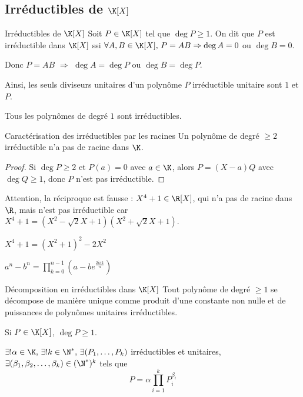 \subsection{Irréductibles de \texorpdfstring{$\K[X]$}{K[X]}}

\begin{definition}{Irréductibles de $\K[X]$}{}
    Soit $P \in \K[X]$ tel que $\deg P \geqslant 1$. On dit que $P$ est irréductible 
    dans $\K[X]$ ssi $\forall A, B \in \K[X], \, P = AB \Rightarrow \deg A = 0$ ou $\deg B = 0$.

    Donc $P = AB$ $\Rightarrow$ $\deg A = \deg P$ ou $\deg B = \deg P$.

    Ainsi, les seuls diviseurs unitaires d'un polynôme $P$ irréductible unitaire sont 
    $1$ et $P$.
\end{definition}

\begin{exemple}
    Tous les polynômes de degré $1$ sont irréductibles.
\end{exemple}


\begin{proposition}{Caractérisation des irréductibles par les racines}{}
    Un polynôme de degré $\geqslant 2$ irréductible n'a pas de racine dans $\K$.
\end{proposition}

\begin{proof}
    Si $\deg P \geqslant 2$ et $P(a) = 0$ avec $a \in \K$, alors
    $P = (X - a) Q$ avec $\deg Q \geqslant 1$, donc $P$ n'est pas irréductible.
\end{proof}

\begin{remarque}
    Attention, la réciproque est fausse :
    $X^4 + 1 \in \R[X]$, qui n'a pas de racine dans $\R$, mais n'est pas irréductible car 
    $X^4 + 1 = (X^2 - \sqrt 2 X + 1)(X^2 + \sqrt 2 X + 1)$.
\end{remarque}


\avspace $X^4 + 1 = (X^2 + 1)^2 - 2X^2$

$\displaystyle a^n - b^n = \prod_{k = 0}^{n - 1} (a - b e^{\frac{2i\pi k} n})$

\begin{theoreme}{Décomposition en irréductibles dans $\K[X]$}{}
    Tout polynôme de degré $\geqslant 1$ se décompose de manière unique comme produit d'une constante 
    non nulle et de puissances de polynômes unitaires irréductibles. 

    Si $ P \in \K[X]$, $\deg P \geqslant 1$. 

    $\exists ! \alpha \in \K, \, \exists ! k \in \N^*, \, \exists (P_1, \ldots, P_k)$ irréductibles et unitaires, 
    $\exists (\beta_1, \beta_2, \ldots, \beta_k) \in (\N^*)^k$ tels que
    $$P = \alpha \prod_{i = 1}^k P_i^{\beta_i}$$
\end{theoreme}

